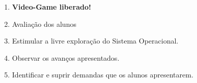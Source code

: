 \begin{enumerate}
	\item \textbf{Video-Game liberado!}
	\item Avaliação dos alunos
	\item Estimular a livre exploração do Sistema Operacional.
	\item Observar os avanços apresentados.
	\item Identificar e suprir demandas que os alunos apresentarem.
\end{enumerate}


